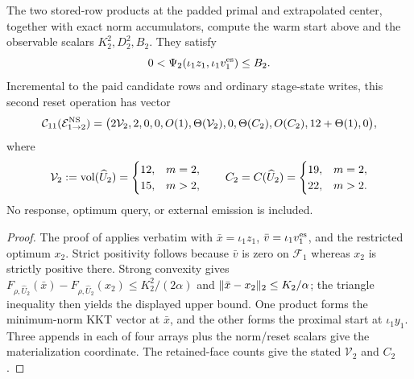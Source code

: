 \begin{lemma}
\label{lem:branch-caterpillar-second-nonsettled-shock-reset}
The two stored-row products at the padded primal and extrapolated center,
together with exact norm accumulators, compute the warm start above and the
observable scalars $K_2^2,D_2^2,B_2$.  They satisfy
\begin{equation}
 0<\Psi_2(\iota_1z_1,\iota_1v_1^{\rm es})\leq B_2.
 \label{eq:branch-caterpillar-second-nonsettled-shock-bound}
\end{equation}
Incremental to the paid candidate rows and ordinary stage-state writes, this
second reset operation has vector
\begin{equation}
 \mathcal C_{11}(\mathcal E_{1\to2}^{\rm NS})=
 \bigl(2\mathcal V_2,2,0,0,O(1),\Theta(\mathcal V_2),0,
 \Theta(C_2),O(C_2),12+\Theta(1),0\bigr),
 \label{eq:branch-caterpillar-second-nonsettled-transition-vector}
\end{equation}
where
\begin{equation*}
 \mathcal V_2:=\operatorname{vol}(\widehat U_2)
 =\begin{cases}12,&m=2,\\15,&m>2,\end{cases}
 \qquad
 C_2=C(\widehat U_2)
 =\begin{cases}19,&m=2,\\22,&m>2.\end{cases}
\end{equation*}
No response, optimum query, or external emission is included.
\end{lemma}

\begin{proof}
The proof of
 applies verbatim with
$\bar x=\iota_1z_1$, $\bar v=\iota_1v_1^{\rm es}$, and the restricted
optimum $x_2$.  Strict positivity follows because $\bar v$ is zero on
$\mathcal F_1$ whereas $x_2$ is strictly positive there.  Strong convexity
gives
$F_{\rho,\widehat U_2}(\bar x)-F_{\rho,\widehat U_2}(x_2)
 \leq K_2^2/(2\alpha)$ and
$\lVert\bar x-x_2\rVert_2\leq K_2/\alpha$; the triangle inequality then yields
the displayed upper bound.  One product forms the minimum-norm KKT vector at
$\bar x$, and the other forms the proximal start at $\iota_1y_1$.  Three
appends in each of four arrays plus the norm/reset scalars give the
materialization coordinate.  The retained-face counts give the stated
$\mathcal V_2$ and $C_2$.
\end{proof}

